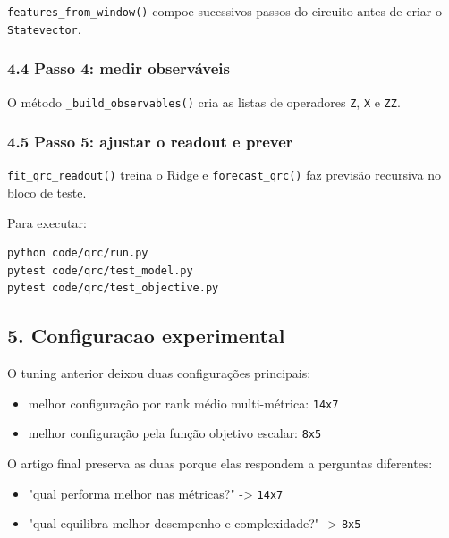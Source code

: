 \documentclass[12pt]{article}
\providecommand{\tightlist}{%
          \setlength{\itemsep}{0pt}\setlength{\parskip}{0pt}}
\begin{document}
\texttt{features\_from\_window()} compoe sucessivos passos do circuito antes de criar o \texttt{Statevector}.

\subsubsection{4.4 Passo 4: medir observáveis}\label{44-passo-4-medir-observuxe1veis}

O método \texttt{\_build\_observables()} cria as listas de operadores \texttt{Z}, \texttt{X} e \texttt{ZZ}.

\subsubsection{4.5 Passo 5: ajustar o readout e prever}\label{45-passo-5-ajustar-o-readout-e-prever}

\texttt{fit\_qrc\_readout()} treina o Ridge e \texttt{forecast\_qrc()} faz previsão recursiva no bloco de teste.

Para executar:

\begin{verbatim}
python code/qrc/run.py
pytest code/qrc/test_model.py
pytest code/qrc/test_objective.py
\end{verbatim}

\subsection{5. Configuracao experimental}\label{5-configuracao-experimental}

O tuning anterior deixou duas configurações principais:

\begin{itemize}
\tightlist
\item
  melhor configuração por rank médio multi-métrica: \texttt{14x7}
\item
  melhor configuração pela função objetivo escalar: \texttt{8x5}
\end{itemize}

O artigo final preserva as duas porque elas respondem a perguntas diferentes:

\begin{itemize}
\tightlist
\item
  "qual performa melhor nas métricas?" -\textgreater{} \texttt{14x7}
\item
  "qual equilibra melhor desempenho e complexidade?" -\textgreater{} \texttt{8x5}
\end{itemize}
\end{document}
